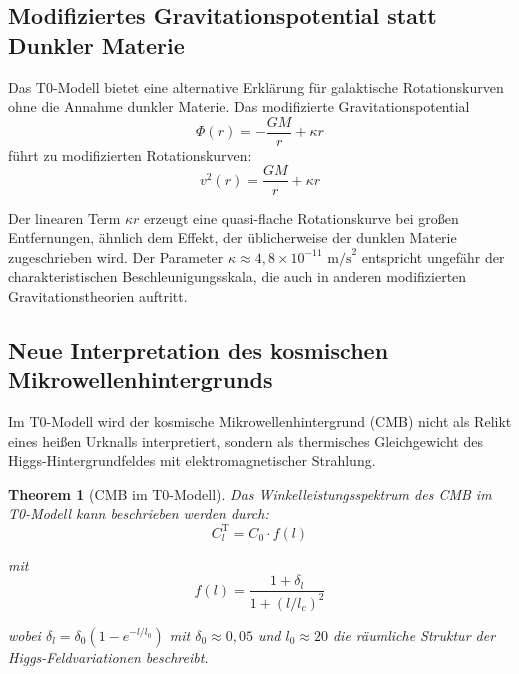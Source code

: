\documentclass{article}
\newtheorem{theorem}{Theorem}[section]
\theoremstyle{definition}
\theoremstyle{remark}
\begin{document}
		\subsection{Modifiziertes Gravitationspotential statt Dunkler Materie}
		
		Das T0-Modell bietet eine alternative Erklärung für galaktische Rotationskurven ohne die Annahme dunkler Materie. Das modifizierte Gravitationspotential
		\begin{equation}
			\Phi(r) = -\frac{GM}{r} + \kappa r
		\end{equation}
		führt zu modifizierten Rotationskurven:
		\begin{equation}
			v^2(r) = \frac{GM}{r} + \kappa r
		\end{equation}
		
		Der linearen Term $\kappa r$ erzeugt eine quasi-flache Rotationskurve bei großen Entfernungen, ähnlich dem Effekt, der üblicherweise der dunklen Materie zugeschrieben wird. Der Parameter $\kappa \approx 4,8 \times 10^{-11} \text{ m/s}^2$ entspricht ungefähr der charakteristischen Beschleunigungsskala, die auch in anderen modifizierten Gravitationstheorien auftritt.
		
		\subsection{Neue Interpretation des kosmischen Mikrowellenhintergrunds}
		
		Im T0-Modell wird der kosmische Mikrowellenhintergrund (CMB) nicht als Relikt eines heißen Urknalls interpretiert, sondern als thermisches Gleichgewicht des Higgs-Hintergrundfeldes mit elektromagnetischer Strahlung.
		
		\begin{theorem}[CMB im T0-Modell]
			Das Winkelleistungsspektrum des CMB im T0-Modell kann beschrieben werden durch:
			\begin{equation}
				C_l^{\text{T}} = C_0 \cdot f(l)
			\end{equation}
			
			mit
			\begin{equation}
				f(l) = \frac{1 + \delta_l}{1 + (l/l_c)^2}
			\end{equation}
			
			wobei $\delta_l = \delta_0 (1 - e^{-l/l_0})$ mit $\delta_0 \approx 0,05$ und $l_0 \approx 20$ die räumliche Struktur der Higgs-Feldvariationen beschreibt.
		\end{theorem}
		
\end{document}
